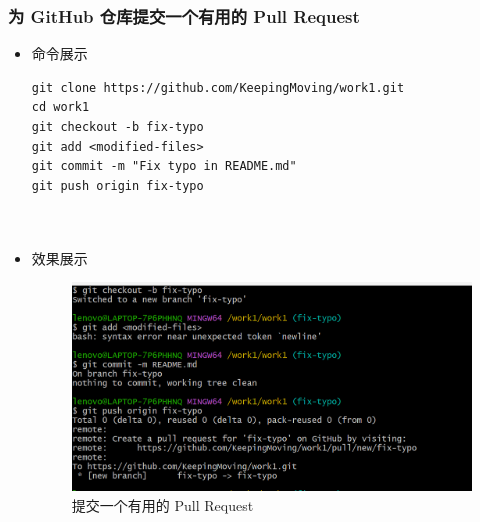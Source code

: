 \documentclass[UTF8]{ctexart}
\begin{document}


\subsubsection{为 GitHub 仓库提交一个有用的 Pull Request}
\begin{itemize}
  \item 命令展示
  \begin{verbatim}
git clone https://github.com/KeepingMoving/work1.git
cd work1
git checkout -b fix-typo
git add <modified-files>
git commit -m "Fix typo in README.md"
git push origin fix-typo



  \end{verbatim}

  \item 效果展示
  \begin{figure}[H]
    \centering
    \includegraphics[width=\textwidth]{n10} %
    \caption{提交一个有用的 Pull Request}
    \label{fig:remote-branch-check}
  \end{figure}

\end{itemize}

\end{document}
